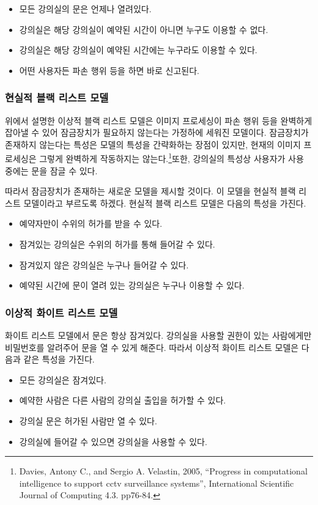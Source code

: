 \documentclass[11pt,a4paper]{article}
\begin{document}
\begin{itemize}
\item 모든 강의실의 문은 언제나 열려있다.
\item 강의실은 해당 강의실이 예약된 시간이 아니면 누구도 이용할 수 없다.
\item 강의실은 해당 강의실이 예약된 시간에는 누구라도 이용할 수 있다.
\item 어떤 사용자든 파손 행위 등을 하면 바로 신고된다.
\end{itemize}

\subsubsection{현실적 블랙 리스트 모델}
위에서 설명한 이상적 블랙 리스트 모델은 이미지 프로세싱이 파손 행위 등을 완벽하게
잡아낼 수 있어 잠금장치가 필요하지 않는다는 가정하에 세워진 모델이다.
잠금장치가 존재하지 않는다는 특성은 모델의 특성을 간략화하는 장점이 있지만,
현재의 이미지 프로세싱은 그렇게 완벽하게 작동하지는 않는다.\footnote{
 Davies, Antony C., and Sergio A. Velastin, 2005, ``Progress in computational
 intelligence to support cctv surveillance systems'', International Scientific
 Journal of Computing 4.3. pp76-84.
}또한, 강의실의
특성상 사용자가 사용 중에는 문을 잠글 수 있다.

따라서 잠금장치가 존재하는 새로운 모델을 제시할 것이다. 이 모델을 현실적 블랙
리스트 모델이라고 부르도록 하겠다. 현실적 블랙 리스트 모델은 다음의 특성을
가진다.
\begin{itemize}
\item 예약자만이 수위의 허가를 받을 수 있다.
\item 잠겨있는 강의실은 수위의 허가를 통해 들어갈 수 있다.
\item 잠겨있지 않은 강의실은 누구나 들어갈 수 있다.
\item 예약된 시간에 문이 열려 있는 강의실은 누구나 이용할 수 있다.
\end{itemize}

\subsubsection{이상적 화이트 리스트 모델}
화이트 리스트 모델에서 문은 항상 잠겨있다. 강의실을 사용할 권한이 있는
사람에게만 비밀번호를 알려주어 문을 열 수 있게 해준다. 따라서 이상적 화이트
리스트 모델은 다음과 같은 특성을 가진다.
\begin{itemize}
\item 모든 강의실은 잠겨있다.
\item 예약한 사람은 다른 사람의 강의실 출입을 허가할 수 있다.
\item 강의실 문은 허가된 사람만 열 수 있다.
\item 강의실에 들어갈 수 있으면 강의실을 사용할 수 있다.
\end{itemize}
\end{document}
